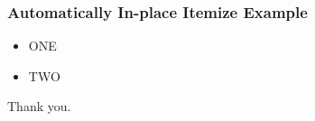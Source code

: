 \documentclass{beamer}
\begin{document}
\begin{frame}
  \frametitle{Automatically In-place Itemize Example}

  \begin{itemize}[<+-| only@+>]
  \item ONE
  \item TWO
  \end{itemize}
\end{frame}


\begin{frame}[label=thank_you]
  \vspace{-1.5in}
  \begin{mdframed}[style=description]
    {\large Thank you.}
  \end{mdframed}
\end{frame}
\end{document}
